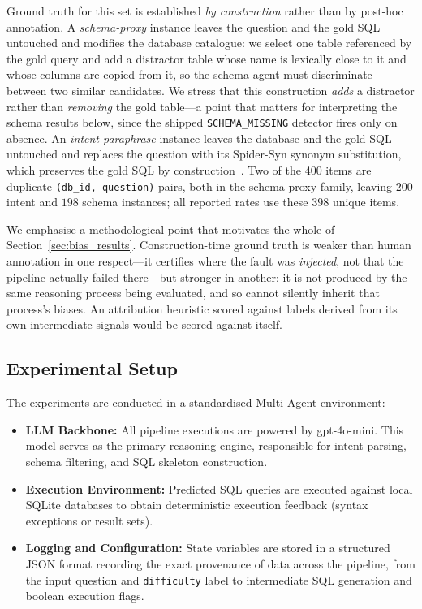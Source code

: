 \documentclass[conference]{IEEEtran}
\begin{document}
Ground truth for this set is established \emph{by construction} rather than by
post-hoc annotation. A \emph{schema-proxy} instance leaves the question and the
gold SQL untouched and modifies the database catalogue: we select one table
referenced by the gold query and add a distractor table whose name is lexically
close to it and whose columns are copied from it, so the schema agent must
discriminate between two similar candidates. We stress that this construction
\emph{adds} a distractor rather than \emph{removing} the gold table---a point
that matters for interpreting the schema results below, since the shipped
\texttt{SCHEMA\_MISSING} detector fires only on absence. An
\emph{intent-paraphrase} instance leaves the database and the gold SQL
untouched and replaces the question with its Spider-Syn synonym substitution,
which preserves the gold SQL by construction~\cite{gan_spider_syn_2021}. Two of
the 400 items are duplicate \texttt{(db\_id, question)} pairs, both in the
schema-proxy family, leaving $200$ intent and $198$ schema instances; all
reported rates use these $398$ unique items.

We emphasise a methodological point that motivates the whole of
Section~\ref{sec:bias_results}. Construction-time ground truth is weaker than
human annotation in one respect---it certifies where the fault was
\emph{injected}, not that the pipeline actually failed there---but stronger in
another: it is not produced by the same reasoning process being evaluated, and
so cannot silently inherit that process's biases. An attribution heuristic
scored against labels derived from its own intermediate signals would be
scored against itself.

\subsection{Experimental Setup}

The experiments are conducted in a standardised Multi-Agent environment:

\begin{itemize}
  \item \textbf{LLM Backbone:} All pipeline executions are powered by
  gpt-4o-mini. This model serves as the primary reasoning engine, responsible
  for intent parsing, schema filtering, and SQL skeleton construction.
  \item \textbf{Execution Environment:} Predicted SQL queries are executed
  against local SQLite databases to obtain deterministic execution feedback
  (syntax exceptions or result sets).
  \item \textbf{Logging and Configuration:} State variables are stored in a
  structured JSON format recording the exact provenance of data across the
  pipeline, from the input question and \texttt{difficulty} label to
  intermediate SQL generation and boolean execution flags.
\end{itemize}
\end{document}
